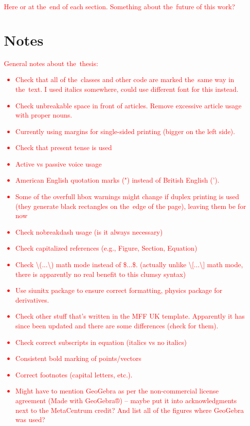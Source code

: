 	\textcolor{red}{Here or at the~end of each section. Something about the~future of this work?}
	
	\section*{Notes}
		\textcolor{red}{General notes about the~thesis:
			\begin{itemize}[topsep=4pt,itemsep=2pt]
				\item Check that all of the~classes and other code are marked the~same way in the~text. I used italics somewhere, could use different font for this instead.
				\item Check unbreakable space in front of articles. Remove excessive article usage with proper nouns.
				\item Currently using margins for single-sided printing (bigger on the left side).
				\item Check that present tense is used
				\item Active vs passive voice usage
				\item American English quotation marks (") instead of British English (').
				\item Some of the overfull hbox warnings might change if duplex printing is used (they generate black rectangles on the~edge of the page), leaving them be for now
				\item Check nobreakdash usage (is it always necessary)
				\item Check capitalized references (e.g., Figure, Section, Equation)
				\item Check \textbackslash(...\textbackslash) math mode instead of \$...\$. (actually unlike \textbackslash[...\textbackslash] math mode, there is apparently no real benefit to this clumsy syntax)
				\item Use siunitx package to ensure correct formatting, physics package for derivatives.
				\item Check other stuff that's written in the MFF UK template. Apparently it has since been updated and there are some differences (check for them).
				\item Check correct subscripts in equation (italics vs no italics)
				\item Consistent bold marking of points/vectors
				\item Correct footnotes (capital letters, etc.).
				\item Might have to mention GeoGebra as per the non-commercial license agreement (Made with GeoGebra®) -- maybe put it into acknowledgments next to the MetaCentrum credit? And list all of the figures where GeoGebra was used?

\end{itemize}}
